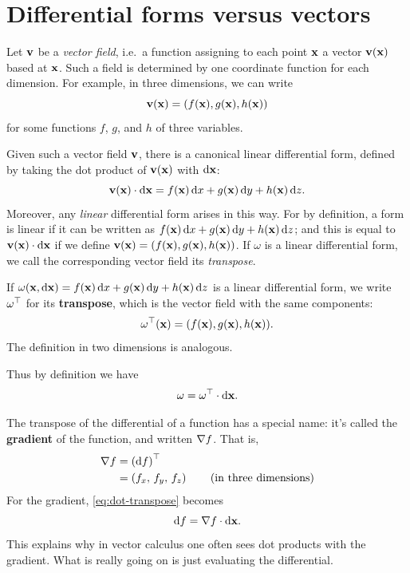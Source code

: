 \section{Differential forms versus vectors}
\label{sec:forms-vs-vectors}

Let $\mathbf{v}$ be a \emph{vector field}, i.e.\ a function assigning to each point $\mathbf{x}$ a vector $\mathbf{v}(\mathbf{x})$ based at $\mathbf{x}$.
Such a field is determined by one coordinate function for each dimension.
For example, in three dimensions, we can write
\[ \mathbf{v}(\mathbf{x}) = (f(\mathbf{x}),g(\mathbf{x}),h(\mathbf{x})) \]
for some functions $f$, $g$, and $h$ of three variables.

Given such a vector field $\mathbf{v}$, there is a canonical linear differential form, defined by taking the dot product of $\mathbf{v}(\mathbf{x})$ with ${\mathrm{d} \mathbf{x}}$:
\[ \mathbf{v}(\mathbf{x}) \cdot {\ensuremath{\mathrm{d} \mathbf{x}}} = f(\mathbf{x})\,{\mathrm{d} x} + g(\mathbf{x})\,{\mathrm{d} y} + h(\mathbf{x})\,{\mathrm{d} z}. \]
Moreover, any \emph{linear} differential form arises in this way.
For by definition, a form is linear if it can be written as $f(\mathbf{x})\,{\mathrm{d} x} + g(\mathbf{x})\,{\mathrm{d} y} + h(\mathbf{x})\,{\mathrm{d} z}$; and this is equal to $\mathbf{v}(\mathbf{x}) \cdot {\ensuremath{\mathrm{d} \mathbf{x}}}$ if we define $\mathbf{v}(\mathbf{x}) = (f(\mathbf{x}),g(\mathbf{x}),h(\mathbf{x}))$.
If $\omega$ is a linear differential form, we call the corresponding vector field its \emph{transpose}.

\begin{defn}
  If $\omega(\mathbf{x},{\mathrm{d} \mathbf{x}}) = f(\mathbf{x})\,{\mathrm{d} x} + g(\mathbf{x})\,{\mathrm{d} y} + h(\mathbf{x})\,{\mathrm{d} z}$ is a linear differential form, we write ${\omega}^\top$ for its \textbf{transpose}, which is the vector field with the same components:
  \[ {\omega}^\top(\mathbf{x}) = (f(\mathbf{x}), g(\mathbf{x}), h(\mathbf{x})). \]
  The definition in two dimensions is analogous.
\end{defn}

Thus by definition we have
\begin{equation}\label{eq:dot-transpose}
  \omega = {\omega}^\top \cdot {\ensuremath{\mathrm{d} \mathbf{x}}}.
\end{equation}

The transpose of the differential of a function has a special name: it's called the \textbf{gradient} of the function, and written $\nabla f$.
That is,
\begin{align*}
  \nabla f &= {({\mathrm{d} f})}^\top\\
  &= \left({f}_{x},\,{f}_{y},\,{f}_{z}\right) \qquad\text{(in three dimensions)}
\end{align*}
For the gradient, \cref{eq:dot-transpose} becomes
\[ {\mathrm{d} f} = \nabla f \cdot {\ensuremath{\mathrm{d} \mathbf{x}}}. \]
This explains why in vector calculus one often sees dot products with the gradient.
What is really going on is just evaluating the differential.

